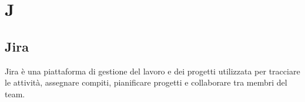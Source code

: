 \section*{J} 
\subsection*{Jira} 
Jira è una piattaforma di gestione del lavoro e dei progetti utilizzata per tracciare le attività, assegnare compiti, pianificare progetti e collaborare tra membri del team.
